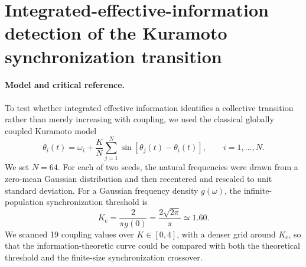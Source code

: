 \documentclass[fleqn,10pt]{wlscirep}
\begin{document}



\section{Integrated-effective-information detection of the Kuramoto synchronization transition}
\label{app:kuramoto-criticality}

\paragraph{Model and critical reference.}
To test whether integrated effective information identifies a collective transition rather than merely increasing with coupling, we used the classical globally coupled Kuramoto model
\begin{equation}
\dot{\theta}_i(t)
=
\omega_i
+
\frac{K}{N}\sum_{j=1}^{N}
\sin\!\left[\theta_j(t)-\theta_i(t)\right],
\qquad i=1,\ldots,N .
\label{eq:kuramoto-critical-model}
\end{equation}
We set \(N=64\). For each of two seeds, the natural frequencies were drawn from a zero-mean Gaussian distribution and then recentered and rescaled to unit standard deviation. For a Gaussian frequency density \(g(\omega)\), the infinite-population synchronization threshold is
\begin{equation}
K_{\mathrm{c}}
=
\frac{2}{\pi g(0)}
=
\frac{2\sqrt{2\pi}}{\pi}
\simeq 1.60.
\label{eq:kuramoto-critical-coupling}
\end{equation}
We scanned 19 coupling values over \(K\in[0,4]\), with a denser grid around \(K_{\mathrm{c}}\), so that the information-theoretic curve could be compared with both the theoretical threshold and the finite-size synchronization crossover.
\end{document}
